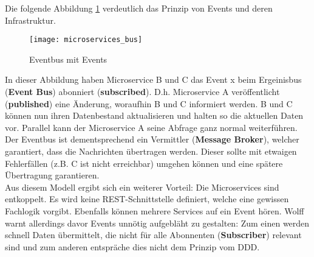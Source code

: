 Die folgende Abbildung \ref{fig:microservices_bus} verdeutlich das Prinzip von Events und deren Infrastruktur.

\begin{figure}[ht]
	\centering
	\texttt{[image: microservices\_bus]}
	\caption[Eventbus mit Events] { Eventbus mit Events\cite{cesardelatorre2018azure}}
	\label{fig:microservices_bus}
\end{figure}

In dieser Abbildung haben Microservice B und C das Event x beim Ergeinisbus (\textbf{Event Bus}) abonniert (\textbf{subscribed}). D.h. Microservice A veröffentlicht (\textbf{published}) eine Änderung, woraufhin B und C informiert werden. B und C können nun ihren Datenbestand aktualisieren und halten so die aktuellen Daten vor. Parallel kann der Microservice A seine Abfrage ganz normal weiterführen. Der Eventbus ist dementsprechend ein Vermittler (\textbf{Message Broker}), welcher garantiert, dass die Nachrichten übertragen werden. Dieser sollte mit etwaigen Fehlerfällen (z.B. C ist nicht erreichbar) umgehen können und eine spätere Übertragung garantieren.\cite{cesardelatorre2018azure}\cite{wolff2018mic_praxis} \\

Aus diesem Modell ergibt sich ein weiterer Vorteil: Die Microservices sind entkoppelt. Es wird keine REST-Schnittstelle definiert, welche eine gewissen Fachlogik vorgibt. Ebenfalls können mehrere Services auf ein Event hören. Wolff warnt allerdings davor Events unnötig aufgebläht zu gestalten: Zum einen werden schnell Daten übermittelt, die nicht für alle Abonnenten (\textbf{Subscriber}) relevant sind und zum anderen entspräche dies nicht dem Prinzip vom DDD.\cite{wolff2018mic_praxis} \\


